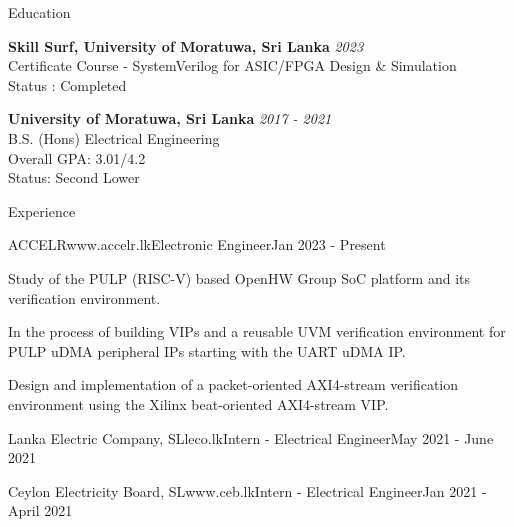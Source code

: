 \documentclass[
	11pt, %
]{./assets/resume} %
\begin{document}
\begin{rSection}{Education}

	\textbf{Skill Surf, University of Moratuwa, Sri Lanka} \hfill \textit{2023} \\ 
	Certificate Course - SystemVerilog for ASIC/FPGA Design \& Simulation \\
	Status : Completed

	\textbf{University of Moratuwa, Sri Lanka} \hfill \textit{2017 - 2021} \\ 
	B.S. (Hons) Electrical Engineering \\
	Overall GPA: 3.01/4.2 \\
	Status: Second Lower
	
\end{rSection}


\begin{rSection}{Experience}

	\begin{rSubsectionX}{ACCELR}{www.accelr.lk}{Electronic Engineer}{Jan 2023 - Present}
		\item Study of the PULP (RISC-V) based OpenHW Group SoC platform and its verification environment.
		\item In the process of building VIPs and a reusable UVM verification environment for PULP uDMA peripheral IPs starting with the UART uDMA IP.
		\item Design and implementation of a packet-oriented AXI4-stream verification environment using the Xilinx beat-oriented AXI4-stream VIP.
	\end{rSubsectionX}

	\begin{rSubsectionSimpleX}{Lanka Electric Company, SL}{leco.lk}{Intern - Electrical Engineer}{May 2021 - June 2021}
	\end{rSubsectionSimpleX}

	\begin{rSubsectionSimpleX}{Ceylon Electricity Board, SL}{www.ceb.lk}{Intern - Electrical Engineer}{Jan 2021 - April 2021}
	\end{rSubsectionSimpleX}

\end{rSection}
\end{document}
